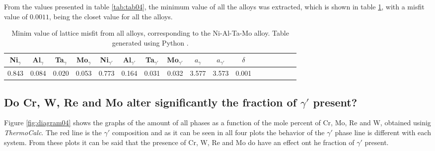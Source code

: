 From the values presented in table \ref{tab:tab04}, the minimum value of all the alloys was extracted, which is shown in table \ref{tab:tab05}, with a misfit value of $0.0011$, being the closet value for all the alloys.

\begin{table}[h]
  \centering
  \begin{tabular}{rrrrrrrrrrrrrrrrr}
    \multicolumn{1}{c}{Ni$_\gamma$} & \multicolumn{1}{c}{Al$_\gamma$} & \multicolumn{1}{c}{Ta$_\gamma$} & \multicolumn{1}{c}{Mo$_\gamma$} & \multicolumn{1}{c}{Ni$_{\gamma'}$} & \multicolumn{1}{c}{Al$_{\gamma'}$} & \multicolumn{1}{c}{Ta$_{\gamma'}$} & \multicolumn{1}{c}{Mo$_{\gamma'}$} & \multicolumn{1}{c}{$a_\gamma$} & \multicolumn{1}{c}{$a_{\gamma'}$} & \multicolumn{1}{c}{$\delta$} \\ \hline \hline
    0.843 & 0.084 & 0.020 & 0.053 & 0.773 & 0.164 & 0.031 & 0.032 & 3.577 & 3.573 & 0.001
  \end{tabular}
  \caption{Minim value of lattice misfit from all alloys, corresponding to the Ni-Al-Ta-Mo alloy. Table generated using Python \citep{mygit}.}
  \label{tab:tab05}
\end{table}

\newpage
\subsection{Do Cr, W, Re and Mo alter significantly the fraction of $\gamma'$ present?}

Figure \ref{fig:diagram04} shows the graphs of the amount of all phases as a function of the mole percent of Cr, Mo, Re and W, obtained usinig \textit{ThermoCalc}. The red line is the $\gamma'$ composition and as it can be seen in all four plots the behavior of the $\gamma'$ phase line is different with each system. From these plots it can be said that the presence of Cr, W, Re and Mo do have an effect ont he fraction of $\gamma'$ present.



